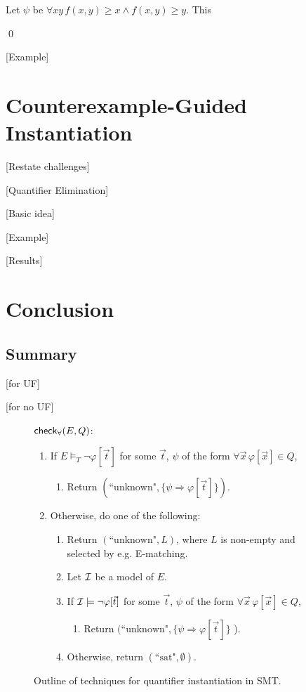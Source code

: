 \documentclass[oribibl]{llncs}
\begin{document}
\begin{example}
Let $\psi$ be $\forall xy\, f( x, y ) \geq x \wedge f( x, y ) \geq y$.
This 

\qed
\end{example}
[Example]

\section{Counterexample-Guided Instantiation}
\label{sec:cegqi}

[Restate challenges]

[Quantifier Elimination]

[Basic idea]

[Example]

[Results]

\section{Conclusion}
\label{sec:conclusion}

\subsection{Summary}
[for UF]

[for no UF]


\begin{figure}[t]
\begin{framed}
$\small\mathsf{check}_\forall( E, Q )$:
\begin{enumerate}
\item[\ ] If $E \models_T \neg \varphi[ \vec t ]$ for some $\vec t$, $\psi$ of the form $\forall \vec x\, \varphi[ \vec x ] \in Q$,
\begin{enumerate}
\item[\ ] Return $( \text{``unknown"}, \{ \psi \Rightarrow \varphi[ \vec t ] \} )$.
\end{enumerate}
\item[\ ] Otherwise, do one of the following:
\begin{enumerate}
\item Return $( \text{``unknown"}, L )$, where $L$ is non-empty and selected by e.g. E-matching.
\item Let $\mathcal{I}$ be a model of $E$. 
\item[\ ] If $\mathcal{I} \models \neg \varphi[ \vec t ]$ for some $\vec t$, $\psi$ of the form $\forall \vec x\, \varphi[ \vec x ] \in Q$,
\begin{enumerate}
\item[\ ] Return $( \text{``unknown"}, \{ \psi \Rightarrow \varphi[ \vec t ] \}$ ).
\end{enumerate}
\item[\ ] Otherwise, return $( \text{``sat"}, \emptyset )$.
\end{enumerate}
\end{enumerate}
\end{framed}
\vspace{-2ex}
\caption{Outline of techniques for quantifier instantiation in SMT.
\label{fig:smtqi}}
\end{figure}
\end{document}

